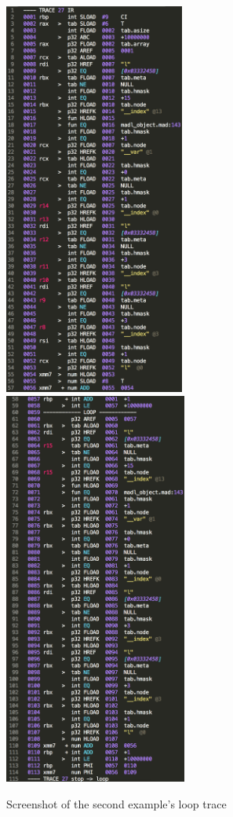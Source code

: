 \begin{figure}[H]
    \centering
    \includegraphics[height=13cm]{./Images/trace-2a}
    \includegraphics[height=13cm]{./Images/trace-2b}
    \caption{Screenshot of the second example's loop trace}
    \label{fig:MO-ex-dump2}
\end{figure}

